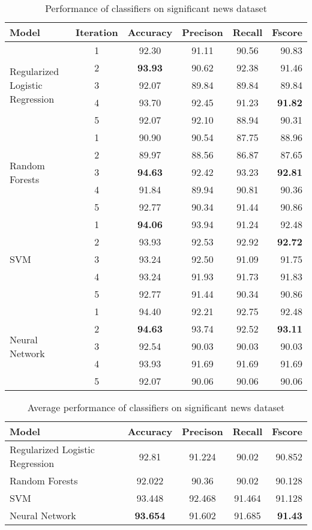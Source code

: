 \begin{table}
\begin{center}
\caption{Performance of classifiers on significant news dataset}
\label{tbl:classifiers_performance}
\begin{tabular}{lccccr}
\toprule 
Model&Iteration&Accuracy&Precison&Recall&Fscore\\
\midrule 
\multirow{5}{*}{Regularized Logistic Regression}
&1&92.30&91.11&90.56&90.83\\
&2&\textbf{93.93}&90.62&92.38&91.46\\
&3&92.07&89.84&89.84&89.84\\
&4&93.70&92.45&91.23&\textbf{91.82}\\
&5&92.07&92.10&88.94&90.31\\
\hline
\multirow{5}{*}{Random Forests}
&1&90.90&90.54&87.75&88.96\\
&2&89.97&88.56&86.87&87.65\\
&3&\textbf{94.63}&92.42&93.23&\textbf{92.81}\\
&4&91.84&89.94&90.81&90.36\\
&5&92.77&90.34&91.44&90.86\\
\hline
\multirow{5}{*}{SVM}
&1&\textbf{94.06}&93.94&91.24&92.48\\
&2&93.93&92.53&92.92&\textbf{92.72}\\
&3&93.24&92.50&91.09&91.75\\
&4&93.24&91.93&91.73&91.83\\
&5&92.77&91.44&90.34&90.86\\
\hline
\multirow{5}{*}{Neural Network}
&1&94.40&92.21&92.75&92.48\\
&2&\textbf{94.63}&93.74&92.52&\textbf{93.11}\\
&3&92.54&90.03&90.03&90.03\\
&4&93.93&91.69&91.69&91.69\\
&5&92.07&90.06&90.06&90.06\\
\bottomrule
\end{tabular}
\end{center}
\end{table}

\begin{table}
\begin{center}
\caption{Average performance of classifiers on significant news dataset}
\label{tbl:average_performance}
\begin{tabular}{lcccr}
\toprule 
Model&Accuracy&Precison&Recall&Fscore\\
\midrule 
Regularized Logistic Regression&92.81&91.224&90.02&90.852\\
Random Forests&92.022&90.36&90.02&90.128\\
SVM&93.448&92.468&91.464&91.128\\
Neural Network&\textbf{93.654}&91.602&91.685&\textbf{91.43}\\
\bottomrule
\end{tabular}
\end{center}
\end{table}

